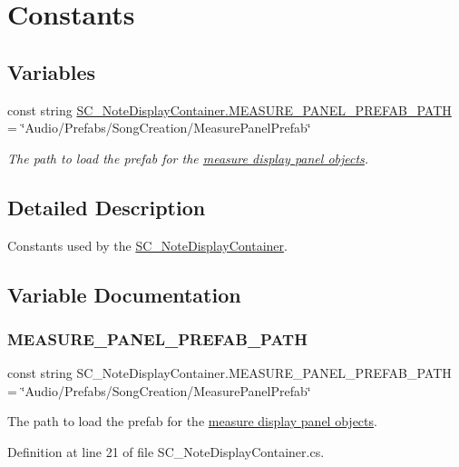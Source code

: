 \hypertarget{group___s_c___n_d_c_const}{}\section{Constants}
\label{group___s_c___n_d_c_const}
\subsection*{Variables}
\begin{DoxyCompactItemize}
\item 
const string \hyperlink{group___s_c___n_d_c_const_gabc95cd739b62996e8a19f0e9417e5f8e}{S\+C\+\_\+\+Note\+Display\+Container.\+M\+E\+A\+S\+U\+R\+E\+\_\+\+P\+A\+N\+E\+L\+\_\+\+P\+R\+E\+F\+A\+B\+\_\+\+P\+A\+TH} = \char`\"{}Audio/Prefabs/Song\+Creation/Measure\+Panel\+Prefab\char`\"{}
\begin{DoxyCompactList}\small\item\em The path to load the prefab for the \hyperlink{group___doc_s_c___m_d_p}{measure display panel objects}. \end{DoxyCompactList}\end{DoxyCompactItemize}


\subsection{Detailed Description}
Constants used by the \hyperlink{class_s_c___note_display_container}{S\+C\+\_\+\+Note\+Display\+Container}. 

\subsection{Variable Documentation}
\mbox{\label{group___s_c___n_d_c_const_gabc95cd739b62996e8a19f0e9417e5f8e}} 
\subsubsection{\texorpdfstring{M\+E\+A\+S\+U\+R\+E\+\_\+\+P\+A\+N\+E\+L\+\_\+\+P\+R\+E\+F\+A\+B\+\_\+\+P\+A\+TH}{MEASURE\_PANEL\_PREFAB\_PATH}}
{\footnotesize\ttfamily const string S\+C\+\_\+\+Note\+Display\+Container.\+M\+E\+A\+S\+U\+R\+E\+\_\+\+P\+A\+N\+E\+L\+\_\+\+P\+R\+E\+F\+A\+B\+\_\+\+P\+A\+TH = \char`\"{}Audio/Prefabs/Song\+Creation/Measure\+Panel\+Prefab\char`\"{}\hspace{0.3cm}{\ttfamily [private]}}



The path to load the prefab for the \hyperlink{group___doc_s_c___m_d_p}{measure display panel objects}. 



Definition at line 21 of file S\+C\+\_\+\+Note\+Display\+Container.\+cs.

